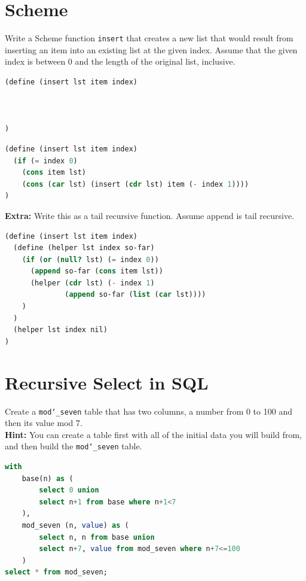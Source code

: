 \documentclass{exam}
\begin{document}
\begin{questions}
\section{Scheme}

\begin{blocksection}
\question Write a Scheme function \texttt{insert} that creates a new list that would
result from inserting an item into an existing list at the given index. Assume
that the given index is between 0 and the length of the original list,
inclusive.

\begin{lstlisting}[language=Scheme]
(define (insert lst item index)



)
\end{lstlisting}

\begin{solution}
\begin{lstlisting}[language=Scheme]
(define (insert lst item index)
  (if (= index 0)
    (cons item lst)
    (cons (car lst) (insert (cdr lst) item (- index 1))))
)
\end{lstlisting}
\end{solution}

\textbf{Extra:} Write this as a tail recursive function. Assume append is tail
recursive.
\begin{solution}
\begin{lstlisting}[language=Scheme]
(define (insert lst item index)
  (define (helper lst index so-far)
    (if (or (null? lst) (= index 0))
      (append so-far (cons item lst))
      (helper (cdr lst) (- index 1)
              (append so-far (list (car lst))))
    )
  )
  (helper lst index nil)
)
\end{lstlisting}
\end{solution}
\end{blocksection}

\section{Recursive Select in SQL}
\begin{blocksection}
\question Create a \texttt{mod\char`_seven} table that has two columns, a number
from 0 to 100 and then its value mod 7.\\
\textbf{Hint:} You can create a table first with all of the initial data you
will build from, and then build the \texttt{mod\char`_seven} table.

\begin{solution}[1in]
\begin{lstlisting}[language=SQL]
with
    base(n) as (
        select 0 union
        select n+1 from base where n+1<7
    ),
    mod_seven (n, value) as (
        select n, n from base union
        select n+7, value from mod_seven where n+7<=100
    )
select * from mod_seven;


\end{lstlisting}
\end{solution}
\end{blocksection}
\end{questions}
\end{document}

